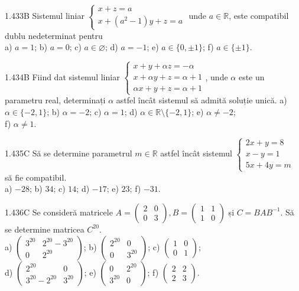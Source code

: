 \documentclass[11pt]{article}
\begin{document}
1.433B Sistemul liniar $\left\{\begin{array}{l}x+z=a \\ x+\left(a^{2}-1\right) y+z=a\end{array}\right.$ unde $a \in \mathbb{R}$, este compatibil dublu nedeterminat pentru\\a) $a=1$; b) $a=0$; c) $a \in \varnothing$; d) $a=-1$; e) $a \in\{0, \pm 1\}$; f) $a \in\{ \pm 1\}$.

1.434B Fiind dat sistemul liniar $\left\{\begin{array}{l}x+y+\alpha z=-\alpha \\ x+\alpha y+z=\alpha+1 \\ \alpha x+y+z=\alpha+1\end{array}\right.$, unde $\alpha$ este un parametru real, determinați $\alpha$ astfel încât sistemul să admită soluție unică. a) $\alpha \in\{-2,1\}$; b) $\alpha=-2$; c) $\alpha=1$; d) $\alpha \in \mathbb{R} \setminus\{-2,1\}$; e) $\alpha \neq-2$;\\ f) $\alpha \neq 1$. 

1.435C Să se determine parametrul $m \in \mathbb{R}$ astfel încât sistemul $\left\{\begin{array}{l}2 x+y=8 \\ x-y=1 \\ 5 x+4 y=m\end{array}\right.$\\ să fie compatibil.\\ a) $-28$; b) $34$; c) $14$; d) $-17$; e) $23$; f) $-31$.

1.436C Se consideră matricele $A=\left(\begin{array}{ll}2 & 0 \\ 0 & 3\end{array}\right), B=\left(\begin{array}{ll}1 & 1 \\ 1 & 0\end{array}\right)$ și $C=B A B^{-1}$. Să se determine matricea $C^{20}$.\\ a) $\left(\begin{array}{cc}3^{20} & 2^{20}-3^{20} \\ 0 & 2^{20}\end{array}\right)$; b) $\left(\begin{array}{cc}2^{20} & 0 \\ 0 & 3^{20}\end{array}\right)$; c) $\left(\begin{array}{ll}1 & 0 \\ 0 & 1\end{array}\right)$;\\ d) $\left(\begin{array}{cc}2^{20} & 0 \\ 3^{20}-2^{20} & 3^{20}\end{array}\right)$; e) $\left(\begin{array}{cc}0 & 2^{20} \\ 3^{20} & 0\end{array}\right)$; f) $\left(\begin{array}{ll}2 & 2 \\ 2 & 3\end{array}\right)$.
\end{document}
